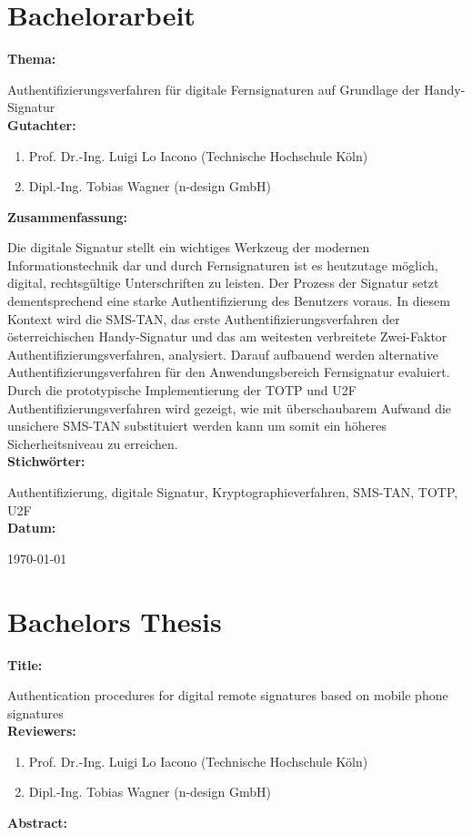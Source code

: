 \chapter*{Bachelorarbeit}
\textbf{Thema:}

Authentifizierungsverfahren für digitale Fernsignaturen auf Grundlage der Handy-Signatur
\\[4ex]
\textbf{Gutachter:}
\begin{enumerate}
    \item Prof. Dr.-Ing. Luigi Lo Iacono (Technische Hochschule Köln)
    \item Dipl.-Ing. Tobias Wagner (n-design GmbH)
\end{enumerate}
\textbf{Zusammenfassung:}

Die digitale Signatur stellt ein wichtiges Werkzeug der modernen Informationstechnik dar und durch Fernsignaturen ist es heutzutage möglich, digital, rechtsgültige Unterschriften zu leisten. Der Prozess der Signatur setzt dementsprechend eine starke Authentifizierung des Benutzers voraus. In diesem Kontext wird die SMS-TAN, das erste Authentifizierungsverfahren der österreichischen Handy-Signatur und das am weitesten verbreitete Zwei-Faktor Authentifizierungsverfahren, analysiert. Darauf aufbauend werden alternative Authentifizierungsverfahren für den Anwendungsbereich Fernsignatur evaluiert. Durch die prototypische Implementierung der TOTP und U2F Authentifizierungsverfahren wird gezeigt, wie mit überschaubarem Aufwand die unsichere SMS-TAN substituiert werden kann um somit ein höheres Sicherheitsniveau zu erreichen.
\\[4ex]
\textbf{Stichwörter:}

Authentifizierung, digitale Signatur, Kryptographieverfahren, SMS-TAN, TOTP, U2F
\\[4ex]
\textbf{Datum:}

\today
\clearpage

\chapter*{Bachelors Thesis}
\textbf{Title:}

Authentication procedures for digital remote signatures based on mobile phone signatures
\\[4ex]
\textbf{Reviewers:}
\begin{enumerate}
    \item Prof. Dr.-Ing. Luigi Lo Iacono (Technische Hochschule Köln)
    \item Dipl.-Ing. Tobias Wagner (n-design GmbH)
\end{enumerate}
\textbf{Abstract:}

